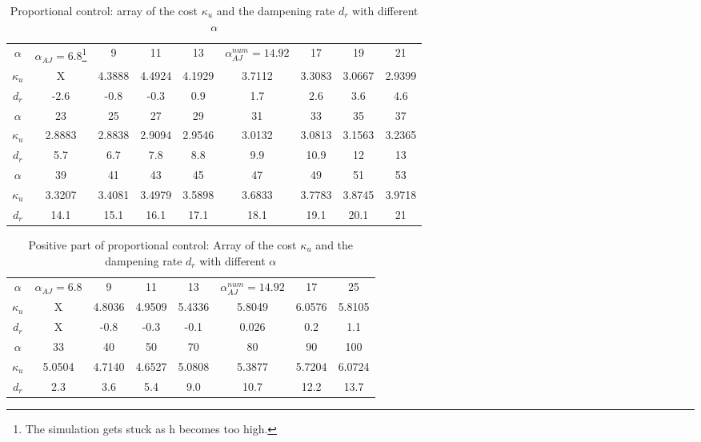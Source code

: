 \documentclass[12pt]{article}
\begin{document}
\begin{table}[ht]
    \caption{Proportional control: array of the cost $\kappa_u$ and the dampening rate $d_r$ with different $\alpha$}
    \label{tab:propctrl_cost}
    \centering
        \begin{tabular}{ |c|c|c|c|c|c|c|c|c| }
        \hline
        $\alpha$ & $\alpha_{AJ}= 6.8$\footnote{The simulation gets stuck as h becomes too high.}& 9 & 11 & 13& $\alpha_{AJ}^{num}=14.92$ & 17& 19& 21\\
        $\kappa_u$ & X & 4.3888 & 4.4924 & 4.1929& 3.7112 & 3.3083& 3.0667 & 2.9399 \\
        $d_r$ & -2.6 & -0.8 & -0.3 & 0.9& 1.7 & 2.6& 3.6 & 4.6 \\ 
        \hline
        $\alpha$ & 23& 25 & 27 & 29 & 31& {\color{red}33} & {\color{red} 35}& {\color{red} 37}\\
        $\kappa_u$ & 2.8883 & 2.8838 & 2.9094 & 2.9546& 3.0132 & {\color{red}3.0813}& {\color{red}3.1563} & {\color{red}3.2365} \\ 
        $d_r$ & 5.7 & 6.7 & 7.8 & 8.8 & 9.9 & {\color{red}10.9} & {\color{red}12} & {\color{red}13}\\
        \hline
        $\alpha$ & 39& 41 & 43 & 45 & 47& 49 & 51& 53\\
        $\kappa_u$ & 3.3207 & 3.4081 & 3.4979 & 3.5898& 3.6833 & 3.7783& 3.8745 & 3.9718 \\ 
        $d_r$ & 14.1 & 15.1 & 16.1 & 17.1 & 18.1 & 19.1 & 20.1 & 21\\
        \hline
        \end{tabular}
\end{table}


\begin{table}[ht]
    \caption{Positive part of proportional control: Array of the cost $\kappa_u$ and the dampening 
    rate $d_r$ with different $\alpha$}
    \label{tab:pos_part_propctrl_cost}
    \centering
        \begin{tabular}{ |c|c|c|c|c|c|c|c| }
        \hline
        $\alpha$ & $\alpha_{AJ}= 6.8$ & 9 & 11 & 13& $\alpha_{AJ}^{num}=14.92$ & 17& 25\\
        $\kappa_u$ & X & 4.8036 & 4.9509 & 5.4336& 5.8049 & 6.0576 & 5.8105 \\
        $d_r$ & X & -0.8 & -0.3 & -0.1& 0.026 & 0.2 & 1.1 \\ 
        \hline
        $\alpha$ & 33& 40 & 50 & 70 & {\color{red}80} & {\color{red}90} & {\color{red}100}\\
        $\kappa_u$ & 5.0504 & 4.7140 & 4.6527 & 5.0808& {\color{red}5.3877} & {\color{red}5.7204}& {\color{red}6.0724} \\ 
        $d_r$ & 2.3 & 3.6 & 5.4 & 9.0 & {\color{red}10.7} & {\color{red}12.2} & {\color{red}13.7}\\
        \hline
        \end{tabular}
\end{table}
\end{document}
